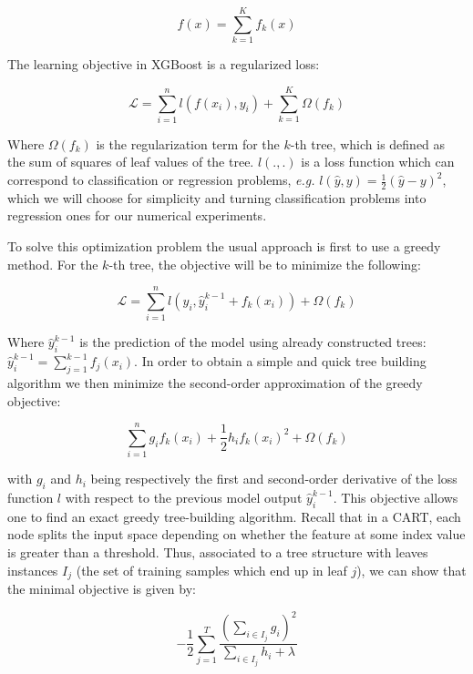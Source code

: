 \documentclass{article}
\theoremstyle{definition}
\begin{document}
\begin{equation*} 
f(x) = \sum_{k = 1}^{K} f_k(x) 
\end{equation*}

The learning objective in XGBoost is a regularized loss:

\begin{equation} 
\mathcal{L} = \sum_{i=1}^n l( f(x_i), y_i) +  \sum_{k=1}^{K} \Omega(f_k) 
\end{equation} 

Where $\Omega(f_k)$ is the regularization term for the $k$-th tree, which is defined as the sum of squares of leaf values of the tree. $l(.,.)$ is a loss function which can correspond to classification or regression problems, \textsl{e.g.} $l(
\hat{y}, y) = \frac 12 (\hat{y} - y)^2$, which we will choose for simplicity and turning classification problems into regression ones for our numerical experiments. 

To solve this optimization problem the usual approach is first to use a greedy method. For the $k$-th tree, the objective will be to minimize the following:

\begin{equation*}
\mathcal{L} = \sum_{i=1}^n l(y_i, \hat{y}_i^{k-1} + f_k(x_i)) +   \Omega(f_k) 
\end{equation*}

Where $\hat{y}_i^{k-1}$ is the prediction of the model using already constructed trees: $\hat{y}_i^{k-1} = \sum_{j=1}^{k-1} f_j(x_i)$. In order to obtain a simple and quick tree building algorithm we then minimize the second-order approximation of the greedy objective:

\begin{equation} 
\sum_{i=1}^n  g_i f_k(x_i) + \frac 12 h_i f_k(x_i)^2 + \Omega(f_k) 
\end{equation} 

with $g_i$ and $h_i$ being respectively the first and second-order derivative of the loss function $l$ with respect to the previous model output $\hat{y}_i^{k-1}$. This objective allows one to find an exact greedy tree-building algorithm. Recall that in a CART, each node splits the input space depending on whether the feature at some index value is greater than a threshold. Thus, associated to a tree structure with leaves instances $I_j$ (the set of training samples which end up in leaf $j$), we can show that the minimal objective is given by: 

\begin{equation} 
- \frac 12 \sum_{j=1}^{T} \frac{\left( \sum_{i \in I_j} g_i \right)^2}{\sum_{i \in I_j} h_i + \lambda}  
\label{objective}
\end{equation} 
\end{document}
